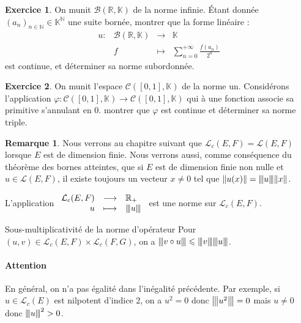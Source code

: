 \documentclass[french]{article}
\newcommand{\N}{\mathbb{N}}
\newcommand{\R}{\mathbb{R}}
\newcommand{\K}{\mathbb{K}}
\newcommand{\vertiii}[1]{{\left\vert\kern-0.25ex\left\vert\kern-0.25ex\left\vert #1 \right\vert\kern-0.25ex\right\vert\kern-0.25ex\right\vert}}
\theoremstyle{plain}
\theoremstyle{definition}
\newtheorem{exo}{Exercice}
\newtheorem*{rmq}{Remarque}
\theoremstyle{remark}
\begin{document}
\begin{exo}
	On munit $\mathcal{B}(\R,\K)$ de la norme infinie. Étant donnée $(a_n)_{n\in\N}\in\K^\N$ une suite bornée, montrer que la forme linéaire : $$\begin{array}{lrcl}
		u:&\mathcal{B}(\R,\K)&\longrightarrow&\K\\
		&f&\longmapsto&\displaystyle\sum_{n=0}^{+\infty}\frac{f(a_n)}{2^n}
	\end{array}$$ est continue, et déterminer sa norme subordonnée.
\end{exo}

\begin{exo}
	On munit l'espace $\mathcal{C}([0,1],\K)$ de la norme un. Considérons l'application $\varphi:\mathcal{C}([0,1],\K)\to\mathcal{C}([0,1],\K)$ qui à une fonction associe sa primitive s'annulant en $0$. montrer que $\varphi$ est continue et déterminer sa norme triple.
\end{exo}

\begin{rmq}
	Nous verrons au chapitre suivant que $\mathcal{L}_c(E,F)=\mathcal{L}(E,F)$ lorsque $E$ est de dimension finie. Nous verrons aussi, comme conséquence du théorème des bornes atteintes, que si $E$ est de dimension finie non nulle et $u\in\mathcal{L}(E,F)$, il existe toujours un vecteur $x\ne0$ tel que $\lVert u(x)\rVert=\vertiii{u}\lVert x\rVert$.
\end{rmq}

\begin{thm}{}%
	L'application $\begin{array}{rcl}
		\mathcal{L}_c(E,F)&\longrightarrow&\R_+\\
		u&\longmapsto&\vertiii{u}
	\end{array}$ est une norme sur $\mathcal{L}_c(E,F)$.
\end{thm}

\begin{thm}{Sous-multiplicativité de la norme d'opérateur}%
	Pour $(u,v)\in\mathcal{L}_c(E,F)\times\mathcal{L}_c(F,G)$, on a $\vertiii{v\circ u}\leqslant\vertiii{v}\vertiii{u}$.
\end{thm}

\paragraph{Attention} En général, on n'a pas égalité dans l'inégalité précédente. Par exemple, si $u\in\mathcal{L}_c(E)$ est nilpotent d'indice $2$, on a $u^2=0$ donc $\vertiii{u^2}=0$ mais $u\ne 0$ donc $\vertiii{u}^2>0$.
\end{document}
